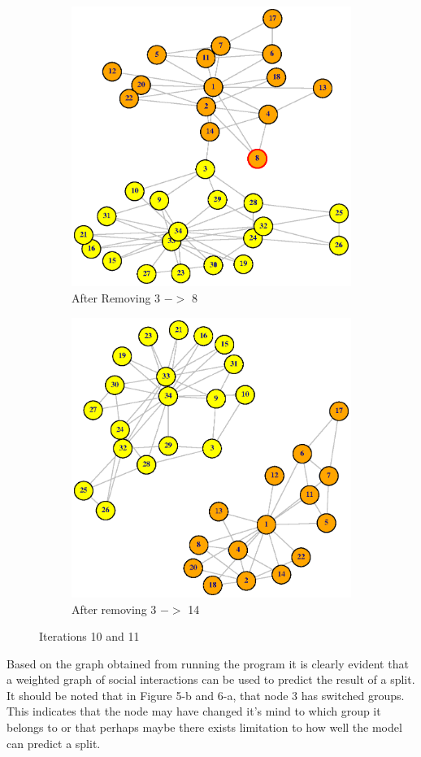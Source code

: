 \documentclass[12pt,letterpaper]{article}
\begin{document}
%
\begin{figure}
\centering
\begin{subfigure}{.5\textwidth}
  \centering
  \includegraphics[width=.9\linewidth]{Plot11}
  \caption{After Removing 3 $->$ 8 }
  \label{fig:sub1}
\end{subfigure}%
\begin{subfigure}{.5\textwidth}
  \centering
  \includegraphics[width=.9\linewidth]{Plot12}
  \caption{After removing 3 $->$ 14}
  \label{fig:sub2}
\end{subfigure}
\caption{Iterations 10 and 11}
\label{fig:test}
\end{figure}
\newpage
Based on the graph obtained from running the program it is clearly evident that a weighted graph of social interactions can be used to predict the result of a split. It should be noted that in Figure 5-b and 6-a, that node 3 has switched groups. This indicates that the node may have changed it's mind to which group it belongs to or that perhaps maybe there exists limitation to how well the model can predict a split. 
\newpage 
\printbibliography
\end{document}
